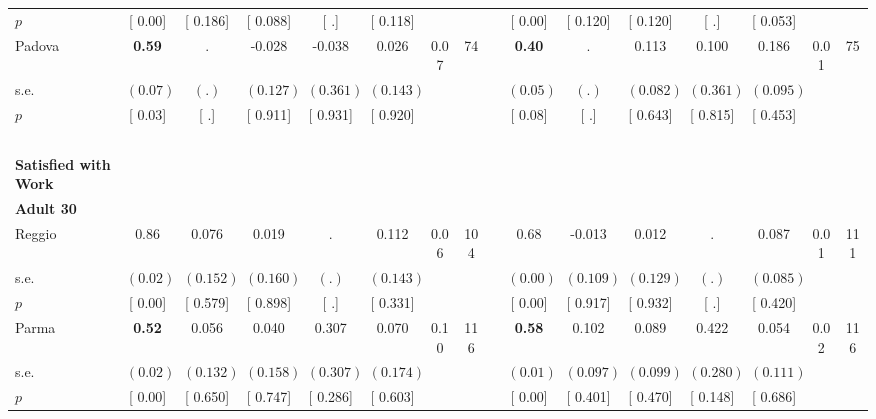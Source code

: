 \begin{longtable}{L{8em} c c c c c c c p{1em} c c c c c c c}
\quad \quad \quad \quad $ p$ & [     0.00] & [    0.186] & [    0.088] & [        .] & [    0.118] & & & & [     0.00] & [    0.120] & [    0.120] & [        .] & [    0.053] & &  \\[1em]
\quad \quad \quad Padova& \textbf{     0.59} &         . &    -0.028 &    -0.038 &     0.026 &      0.07 &        74 & & \textbf{     0.40} &         . &     0.113 &     0.100 &     0.186 &      0.01 &        75  \\*
\quad \quad \quad \quad s.e.& $ (     0.07)$ & $ (        .)$ & $ (    0.127)$ & $ (    0.361)$ & $ (    0.143)$ & & & & $ (     0.05)$ & $ (        .)$ & $ (    0.082)$ & $ (    0.361)$ & $ (    0.095)$ & &  \\*
\quad \quad \quad \quad $ p$ & [     0.03] & [        .] & [    0.911] & [    0.931] & [    0.920] & & & & [     0.08] & [        .] & [    0.643] & [    0.815] & [    0.453] & &  \\[1em]
~\\[1em]
\textbf{Satisfied with Work} \\*
\quad \quad \textbf{Adult 30} & & & & & & & & & & & & & & & \\* 
\quad \quad \quad Reggio& 0.86 &     0.076 &     0.019 &         . &     0.112 &      0.06 &       104 & & 0.68 &    -0.013 &     0.012 &         . &     0.087 &      0.01 &       111  \\*
\quad \quad \quad \quad s.e.& $ (     0.02)$ & $ (    0.152)$ & $ (    0.160)$ & $ (        .)$ & $ (    0.143)$ & & & & $ (     0.00)$ & $ (    0.109)$ & $ (    0.129)$ & $ (        .)$ & $ (    0.085)$ & &  \\*
\quad \quad \quad \quad $ p$ & [     0.00] & [    0.579] & [    0.898] & [        .] & [    0.331] & & & & [     0.00] & [    0.917] & [    0.932] & [        .] & [    0.420] & &  \\[1em]
\quad \quad \quad Parma& \textbf{     0.52} &     0.056 &     0.040 &     0.307 &     0.070 &      0.10 &       116 & & \textbf{     0.58} &     0.102 &     0.089 &     0.422 &     0.054 &      0.02 &       116  \\*
\quad \quad \quad \quad s.e.& $ (     0.02)$ & $ (    0.132)$ & $ (    0.158)$ & $ (    0.307)$ & $ (    0.174)$ & & & & $ (     0.01)$ & $ (    0.097)$ & $ (    0.099)$ & $ (    0.280)$ & $ (    0.111)$ & &  \\*
\quad \quad \quad \quad $ p$ & [     0.00] & [    0.650] & [    0.747] & [    0.286] & [    0.603] & & & & [     0.00] & [    0.401] & [    0.470] & [    0.148] & [    0.686] & &  \\[1em]

\end{longtable}
